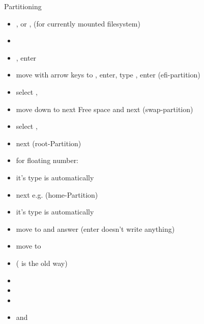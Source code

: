 \begin{frame}{Partitioning\vspace{0.5cm}}
  \begin{itemize}
    \item {},  or ,  (for currently mounted filesystem)
    \item {}
    \item {}, enter
    \item move with arrow keys to , enter, type , enter (efi-partition)
    \item select , 
    \item move down to next Free space and next  (swap-partition)
    \item select , 
    \item next  (root-Partition)
    \item for floating number: 
    \item it's type is automatically 
    \item next e.g.  (home-Partition)
    \item it's type is automatically 
    \item move to  and answer  (enter doesn't write anything)
    \item move to 
    \item ( is the old way)
    \item {}
    \item {}
    \item {}
    \item {} and 
  \end{itemize}
\end{frame}

